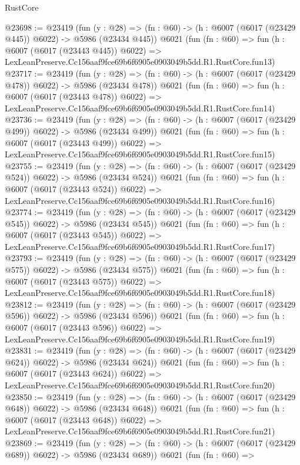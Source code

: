 \begin{lexlean}{RustCore}
\begin{coremodule}
@23698 := @23419
    (fun (y : @28) => (fn : @60) -> (h : @6007 (@6017 (@23429 @445)) @6022) -> @5986 (@23434 @445))
    @6021
    (fun (fn : @60) =>
    fun (h : @6007 (@6017 (@23443 @445)) @6022) =>
    LexLeanPreserve.Cc156aaf9fce69b6f6905e0903049b5dd.R1.RustCore.fun13)
@23717 := @23419
    (fun (y : @28) => (fn : @60) -> (h : @6007 (@6017 (@23429 @478)) @6022) -> @5986 (@23434 @478))
    @6021
    (fun (fn : @60) =>
    fun (h : @6007 (@6017 (@23443 @478)) @6022) =>
    LexLeanPreserve.Cc156aaf9fce69b6f6905e0903049b5dd.R1.RustCore.fun14)
@23736 := @23419
    (fun (y : @28) => (fn : @60) -> (h : @6007 (@6017 (@23429 @499)) @6022) -> @5986 (@23434 @499))
    @6021
    (fun (fn : @60) =>
    fun (h : @6007 (@6017 (@23443 @499)) @6022) =>
    LexLeanPreserve.Cc156aaf9fce69b6f6905e0903049b5dd.R1.RustCore.fun15)
@23755 := @23419
    (fun (y : @28) => (fn : @60) -> (h : @6007 (@6017 (@23429 @524)) @6022) -> @5986 (@23434 @524))
    @6021
    (fun (fn : @60) =>
    fun (h : @6007 (@6017 (@23443 @524)) @6022) =>
    LexLeanPreserve.Cc156aaf9fce69b6f6905e0903049b5dd.R1.RustCore.fun16)
@23774 := @23419
    (fun (y : @28) => (fn : @60) -> (h : @6007 (@6017 (@23429 @545)) @6022) -> @5986 (@23434 @545))
    @6021
    (fun (fn : @60) =>
    fun (h : @6007 (@6017 (@23443 @545)) @6022) =>
    LexLeanPreserve.Cc156aaf9fce69b6f6905e0903049b5dd.R1.RustCore.fun17)
@23793 := @23419
    (fun (y : @28) => (fn : @60) -> (h : @6007 (@6017 (@23429 @575)) @6022) -> @5986 (@23434 @575))
    @6021
    (fun (fn : @60) =>
    fun (h : @6007 (@6017 (@23443 @575)) @6022) =>
    LexLeanPreserve.Cc156aaf9fce69b6f6905e0903049b5dd.R1.RustCore.fun18)
@23812 := @23419
    (fun (y : @28) => (fn : @60) -> (h : @6007 (@6017 (@23429 @596)) @6022) -> @5986 (@23434 @596))
    @6021
    (fun (fn : @60) =>
    fun (h : @6007 (@6017 (@23443 @596)) @6022) =>
    LexLeanPreserve.Cc156aaf9fce69b6f6905e0903049b5dd.R1.RustCore.fun19)
@23831 := @23419
    (fun (y : @28) => (fn : @60) -> (h : @6007 (@6017 (@23429 @624)) @6022) -> @5986 (@23434 @624))
    @6021
    (fun (fn : @60) =>
    fun (h : @6007 (@6017 (@23443 @624)) @6022) =>
    LexLeanPreserve.Cc156aaf9fce69b6f6905e0903049b5dd.R1.RustCore.fun20)
@23850 := @23419
    (fun (y : @28) => (fn : @60) -> (h : @6007 (@6017 (@23429 @648)) @6022) -> @5986 (@23434 @648))
    @6021
    (fun (fn : @60) =>
    fun (h : @6007 (@6017 (@23443 @648)) @6022) =>
    LexLeanPreserve.Cc156aaf9fce69b6f6905e0903049b5dd.R1.RustCore.fun21)
@23869 := @23419
    (fun (y : @28) => (fn : @60) -> (h : @6007 (@6017 (@23429 @689)) @6022) -> @5986 (@23434 @689))
    @6021
    (fun (fn : @60) =>

\end{coremodule}
\end{lexlean}
